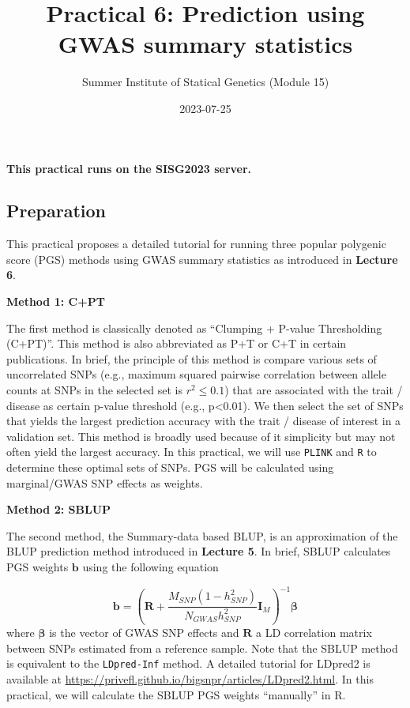 \documentclass[
  letterpaper,
  DIV=11,
  numbers=noendperiod]{scrartcl}
\title{Practical 6: Prediction using GWAS summary statistics}
\author{Summer Institute of Statical Genetics (Module 15)}
\date{2023-07-25}
\begin{document}
\maketitle


{\textbf{This practical runs on the SISG2023 server.}}

\subsection{Preparation}\label{preparation}

This practical proposes a detailed tutorial for running three popular
polygenic score (PGS) methods using GWAS summary statistics as
introduced in \textbf{Lecture 6}.

\textbf{Method 1: C+PT}

The first method is classically denoted as ``Clumping + P-value
Thresholding (C+PT)''. This method is also abbreviated as P+T or C+T in
certain publications. In brief, the principle of this method is compare
various sets of uncorrelated SNPs (e.g., maximum squared pairwise
correlation between allele counts at SNPs in the selected set is
\(r^2 \leq 0.1\)) that are associated with the trait / disease as
certain p-value threshold (e.g., p\textless0.01). We then select the set
of SNPs that yields the largest prediction accuracy with the trait /
disease of interest in a validation set. This method is broadly used
because of it simplicity but may not often yield the largest accuracy.
In this practical, we will use \texttt{PLINK} and \texttt{R} to
determine these optimal sets of SNPs. PGS will be calculated using
marginal/GWAS SNP effects as weights.

\textbf{Method 2: SBLUP}

The second method, the Summary-data based BLUP, is an approximation of
the BLUP prediction method introduced in \textbf{Lecture 5}. In brief,
SBLUP calculates PGS weights \(\mathbf{b}\) using the following equation

\[ \mathbf{b} = \left( \mathbf{R} + \frac{M_{SNP}(1-h_{SNP}^2)}{N_{GWAS}h_{SNP}^2}\mathbf{I}_M \right)^{-1} \boldsymbol{\beta} \]
where \(\boldsymbol{\beta}\) is the vector of GWAS SNP effects and
\(\mathbf{R}\) a LD correlation matrix between SNPs estimated from a
reference sample. Note that the SBLUP method is equivalent to the
\texttt{LDpred-Inf} method. A detailed tutorial for LDpred2 is available
at \url{https://privefl.github.io/bigsnpr/articles/LDpred2.html}. In
this practical, we will calculate the SBLUP PGS weights ``manually'' in
R.
\end{document}
